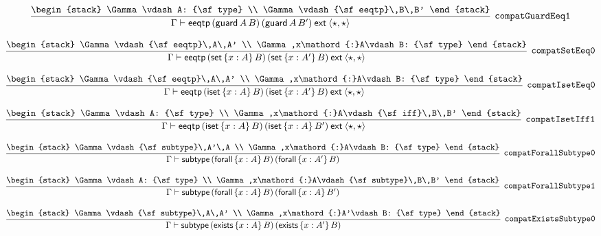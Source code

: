 \[
\infer[{\tt compatGuardEeq1}]{\Gamma \vdash {\sf eeqtp}\,({\sf guard}\,A\,B)\,({\sf guard}\,A\,B')\:{\sf ext}\:\langle \star ,\star \rangle }{
\begin{stack}
\Gamma \vdash A: {\sf type}
\\
\Gamma \vdash {\sf eeqtp}\,B\,B'
\end{stack}}
\]

\[
\infer[{\tt compatSetEeq0}]{\Gamma \vdash {\sf eeqtp}\,({\sf set}\,\{x : A\}\,B)\,({\sf set}\,\{x : A'\}\,B)\:{\sf ext}\:\langle \star ,\star \rangle }{
\begin{stack}
\Gamma \vdash {\sf eeqtp}\,A\,A'
\\
\Gamma ,x\mathord{:}A\vdash B: {\sf type}
\end{stack}}
\]

\[
\infer[{\tt compatIsetEeq0}]{\Gamma \vdash {\sf eeqtp}\,({\sf iset}\,\{x : A\}\,B)\,({\sf iset}\,\{x : A'\}\,B)\:{\sf ext}\:\langle \star ,\star \rangle }{
\begin{stack}
\Gamma \vdash {\sf eeqtp}\,A\,A'
\\
\Gamma ,x\mathord{:}A\vdash B: {\sf type}
\end{stack}}
\]

\[
\infer[{\tt compatIsetIff1}]{\Gamma \vdash {\sf eeqtp}\,({\sf iset}\,\{x : A\}\,B)\,({\sf iset}\,\{x : A\}\,B')\:{\sf ext}\:\langle \star ,\star \rangle }{
\begin{stack}
\Gamma \vdash A: {\sf type}
\\
\Gamma ,x\mathord{:}A\vdash {\sf iff}\,B\,B'
\end{stack}}
\]

\[
\infer[{\tt compatForallSubtype0}]{\Gamma \vdash {\sf subtype}\,({\sf forall}\,\{x : A\}\,B)\,({\sf forall}\,\{x : A'\}\,B)}{
\begin{stack}
\Gamma \vdash {\sf subtype}\,A'\,A
\\
\Gamma ,x\mathord{:}A\vdash B: {\sf type}
\end{stack}}
\]

\[
\infer[{\tt compatForallSubtype1}]{\Gamma \vdash {\sf subtype}\,({\sf forall}\,\{x : A\}\,B)\,({\sf forall}\,\{x : A\}\,B')}{
\begin{stack}
\Gamma \vdash A: {\sf type}
\\
\Gamma ,x\mathord{:}A\vdash {\sf subtype}\,B\,B'
\end{stack}}
\]

\[
\infer[{\tt compatExistsSubtype0}]{\Gamma \vdash {\sf subtype}\,({\sf exists}\,\{x : A\}\,B)\,({\sf exists}\,\{x : A'\}\,B)}{
\begin{stack}
\Gamma \vdash {\sf subtype}\,A\,A'
\\
\Gamma ,x\mathord{:}A'\vdash B: {\sf type}
\end{stack}}
\]

